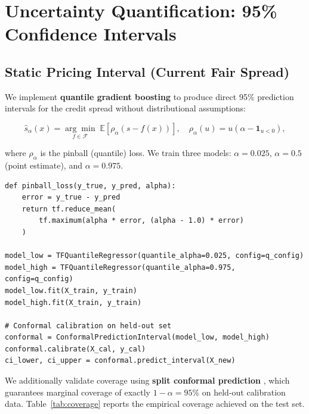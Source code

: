 \documentclass[12pt, a4paper]{article}
\theoremstyle{definition}
\begin{document}
\section{Uncertainty Quantification: 95\% Confidence Intervals}
\label{sec:ci}

\subsection{Static Pricing Interval (Current Fair Spread)}

We implement \textbf{quantile gradient boosting} to produce direct 95\% prediction
intervals for the credit spread without distributional assumptions:

\begin{equation}
  \hat{s}_{\alpha}(x) = \underset{f \in \mathcal{F}}{\arg\min}\;
    \mathbb{E}\!\left[\rho_\alpha\!\left(s - f(x)\right)\right], \quad
    \rho_\alpha(u) = u(\alpha - \mathbf{1}_{u < 0}),
\end{equation}

where $\rho_\alpha$ is the pinball (quantile) loss.
We train three models: $\alpha = 0.025$, $\alpha = 0.5$ (point estimate), and
$\alpha = 0.975$.

\begin{lstlisting}[caption={Quantile regression with TensorFlow pinball loss (excerpt from \texttt{loan\_pricing/models/quantile\_model.py}).}, label={lst:quantile}]
def pinball_loss(y_true, y_pred, alpha):
    error = y_true - y_pred
    return tf.reduce_mean(
        tf.maximum(alpha * error, (alpha - 1.0) * error)
    )

model_low = TFQuantileRegressor(quantile_alpha=0.025, config=q_config)
model_high = TFQuantileRegressor(quantile_alpha=0.975, config=q_config)
model_low.fit(X_train, y_train)
model_high.fit(X_train, y_train)

# Conformal calibration on held-out set
conformal = ConformalPredictionInterval(model_low, model_high)
conformal.calibrate(X_cal, y_cal)
ci_lower, ci_upper = conformal.predict_interval(X_new)
\end{lstlisting}

We additionally validate coverage using \textbf{split conformal prediction}
\citep{angelopoulos2023conformal}, which guarantees marginal coverage of exactly
$1 - \alpha = 95\%$ on held-out calibration data.  Table~\ref{tab:coverage} reports
the empirical coverage achieved on the test set.
\end{document}
